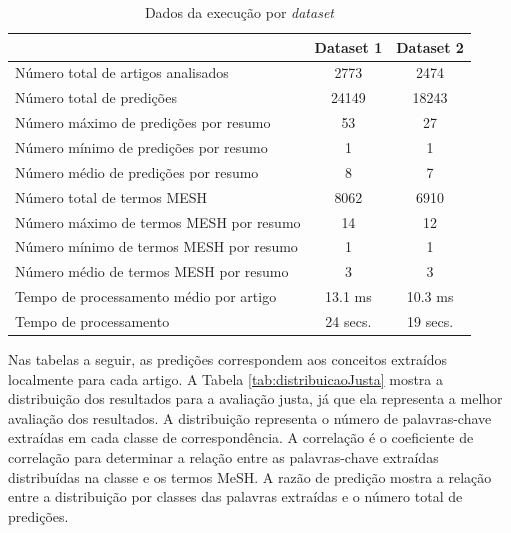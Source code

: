 \begin{table}[htbp]
\center
\begin{tabular}{|l|c|c|}
\hline
 & \multicolumn{1}{l|}{\textbf{Dataset 1}} & \multicolumn{1}{l|}{\textbf{Dataset 2}} \\ \hline
Número total de artigos analisados & 2773 & 2474 \\ \hline
Número total de predições  & 24149 & 18243 \\ \hline
Número máximo de predições por resumo & 53 & 27 \\ \hline
Número mínimo de predições por resumo & 1 & 1 \\ \hline
Número médio de predições por resumo & 8 & 7 \\ \hline
Número total de termos MESH & 8062 & 6910 \\ \hline
Número máximo de termos MESH por resumo & 14 & 12 \\ \hline
Número mínimo de termos MESH por resumo & 1 & 1 \\ \hline
Número médio de termos MESH por resumo & 3 & 3 \\ \hline
Tempo de processamento médio por artigo & 13.1 ms & 10.3 ms \\ \hline
Tempo de processamento & 24 secs. & 19 secs. \\ \hline
\end{tabular}
\caption{Dados da execução por \emph{dataset}}
\label{tab:dadosDataset}
\end{table}

Nas tabelas a seguir, as predições correspondem aos conceitos extraídos localmente para cada artigo. A Tabela \ref{tab:distribuicaoJusta} mostra a distribuição dos resultados para a avaliação justa, já que ela representa a melhor avaliação dos resultados. A distribuição representa o número de palavras-chave extraídas em cada classe de correspondência. A correlação é o coeficiente de correlação para determinar a relação entre as palavras-chave extraídas distribuídas na classe e os termos MeSH. A razão de predição mostra a relação entre a distribuição por classes das palavras extraídas e o número total de predições.

